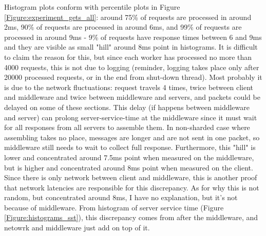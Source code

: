 \documentclass[11pt,a4paper]{article}
\begin{document}
Histogram plots conform with percentile plots in Figure \ref{Figure:experiment_gets_all}: around 75\% of requests are processed in around 2ms, 90\% of requests are processed in around 6ms, and 99\% of requests are processed in around 9ms - 9\% of requests have response times between 6 and 9ms and they are visible as small "hill" around 8ms point in histograms. It is difficult to claim the reason for this, but since each worker has processed no more than 4000 requests, this is not due to logging (reminder, logging takes place only after 20000 processed requests, or in the end from shut-down thread). Most probably it is due to the network fluctuations: request travels 4 times, twice between client and middleware and twice between middleware and servers, and packets could be delayed on some of these sections. This delay (if happens between middleware and server) can prolong server-service-time at the middleware since it must wait for all responses from all servers to assemble them. In non-sharded case where assembling takes no place, messages are longer and are not sent in one packet, so middleware still needs to wait to collect full response. Furthermore, this "hill" is lower and concentrated around 7.5ms point when measured on the middleware, but is higher and concentrated around 8ms point when measured on the client. Since there is only network between client and middleware, this is another proof that network latencies are responsible for this discrepancy. As for why this is not random, but concentrated around 8ms, I have no explanation, but it's not because of middleware. From histogram of server service time (Figure \ref{Figure:histograms_sst}), this discrepancy comes from after the middleware, and netowrk and middleware just add on top of it.
\end{document}
